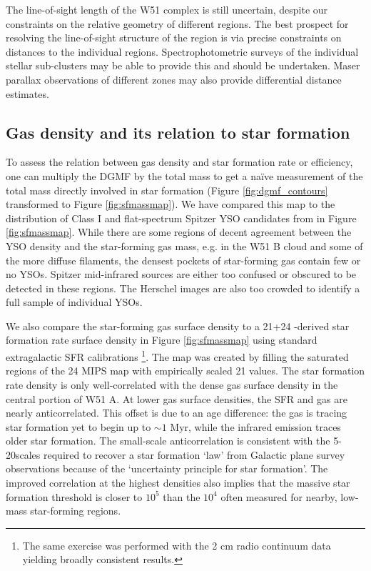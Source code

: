 The line-of-sight length of the W51 complex is still uncertain, despite our
constraints on the relative geometry of different regions.  The best prospect
for resolving the line-of-sight structure of the region is via precise
constraints on distances to the individual regions.  Spectrophotometric surveys
of the individual stellar sub-clusters may be able to provide this and should
be undertaken.  Maser parallax observations of different zones may also provide
differential distance estimates.

\subsection{Gas density and its relation to star formation}
To assess the relation between gas density and star formation rate or
efficiency, one can multiply the DGMF by the total mass to get a naïve
measurement of the total mass directly involved in star formation (Figure
\ref{fig:dgmf_contours} transformed to Figure \ref{fig:sfmassmap}).  We have
compared this map to the distribution of Class I and flat-spectrum Spitzer YSO
candidates from \citet{Kang2009a} in Figure \ref{fig:sfmassmap}.  While there
are some regions of decent agreement between the YSO density and the
star-forming gas mass, e.g.  in the W51 B cloud and some of the more diffuse
filaments, the densest pockets of star-forming gas contain few or no YSOs.
Spitzer mid-infrared sources are either too confused or obscured to be detected
in these regions.  The Herschel images are also too crowded to identify a full
sample of individual YSOs.

We also compare the star-forming gas surface density to a 21+24
\um-derived star formation rate surface density in Figure \ref{fig:sfmassmap}
using standard extragalactic SFR calibrations
\citep{Price2001a,Carey2009a,Rieke2009a,Kennicutt2012a}\footnote{The same
exercise was performed with the 2 cm radio continuum data yielding broadly
consistent results.}.  The map was created
by filling the saturated regions of the 24 \um MIPS map with empirically scaled 
21 \um values.
The star formation rate density is only well-correlated with the dense gas
surface density in the central portion of W51 A.  At lower gas surface
densities, the SFR and gas are nearly anticorrelated.  This offset is due to an
age difference: the gas is tracing star formation yet to begin up to $\sim1$
Myr, while the infrared emission traces older \citep[0-100 Myr, with a peak at
5 Myr;][]{Kennicutt2012a} star formation.  The small-scale anticorrelation
is consistent with the 5-20\arcmin scales required to recover a star formation
`law' from Galactic plane survey observations \citep{Vutisalchavakul2014a}
because of the \citet{Kruijssen2014a} `uncertainty principle for star
formation'.
The improved correlation at the highest densities also implies that the massive
star formation threshold is closer to $10^5$ \percc than the $10^4$ \percc
often measured for nearby, low-mass star-forming regions.

